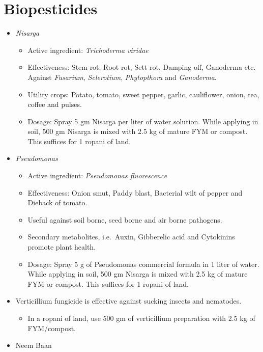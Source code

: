 \documentclass[
  openany]{book}
\providecommand{\tightlist}{%
  \setlength{\itemsep}{0pt}\setlength{\parskip}{0pt}}
\begin{document}
\hypertarget{biopesticides}{%
\section{Biopesticides}\label{biopesticides}}

\begin{itemize}
\tightlist
\item
  \emph{Nisarga}

  \begin{itemize}
  \tightlist
  \item
    Active ingredient: \emph{Trichoderma viridae}
  \item
    Effectiveness: Stem rot, Root rot, Sett rot, Damping off, Ganoderma etc. Against \emph{Fusarium}, \emph{Sclerotium}, \emph{Phytopthora} and \emph{Ganoderma}.
  \item
    Utility crops: Potato, tomato, sweet pepper, garlic, cauliflower, onion, tea, coffee and pulses.
  \item
    Dosage: Spray 5 gm Nisarga per liter of water solution. While applying in soil, 500 gm Nisarga is mixed with 2.5 kg of mature FYM or compost. This suffices for 1 ropani of land.
  \end{itemize}
\item
  \emph{Pseudomonas}

  \begin{itemize}
  \tightlist
  \item
    Active ingredient: \emph{Pseudomonas fluorescence}
  \item
    Effectiveness: Onion smut, Paddy blast, Bacterial wilt of pepper and Dieback of tomato.
  \item
    Useful against soil borne, seed borne and air borne pathogens.
  \item
    Secondary metabolites, i.e.~Auxin, Gibberelic acid and Cytokinins promote plant health.
  \item
    Dosage: Spray 5 g of Pseudomonas commercial formula in 1 liter of water. While applying in soil, 500 gm Nisarga is mixed with 2.5 kg of mature FYM or compost. This suffices for 1 ropani of land.
  \end{itemize}
\item
  Verticillium fungicide is effective against sucking insects and nematodes.

  \begin{itemize}
  \tightlist
  \item
    In a ropani of land, use 500 gm of verticillium preparation with 2.5 kg of FYM/compost.
  \end{itemize}
\item
  Neem Baan


\end{itemize}
\end{document}
